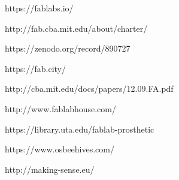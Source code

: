 {\nachweisschrift
https://fablabs.io/\par
http://fab.cba.mit.edu/about/charter/\par
https://zenodo.org/record/890727\par
https://fab.city/\par
http://cba.mit.edu/docs/papers/12.09.FA.pdf\par
http://www.fablabhouse.com/\par
https://library.uta.edu/fablab-prosthetic\par
https://www.osbeehives.com/\par
http://making-sense.eu/\par}

